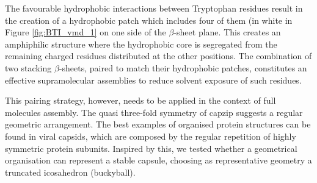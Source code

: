 
The favourable hydrophobic interactions between Tryptophan residues result in the creation of a hydrophobic patch which includes four of them (in white in Figure \ref{fig:BTI_vmd_1} on one side of the $\beta$-sheet plane.
%
This creates an amphiphilic structure where the hydrophobic core is segregated from the remaining charged residues distributed at the other positions.
%
The combination of two stacking $\beta$-sheets, paired to match their hydrophobic patches, constitutes an effective supramolecular assemblies to reduce solvent exposure of such residues.


This pairing strategy, however, needs to be applied in the context of full molecules assembly.
%
The quasi three-fold symmetry of capzip suggests a regular geometric arrangement.
%
The best examples of organised protein structures can be found in viral capsids, which are composed by the regular repetition of highly symmetric protein subunits.
%
Inspired by this, we tested whether a geometrical organisation can represent a stable capsule, choosing as representative geometry a truncated icosahedron (buckyball).

